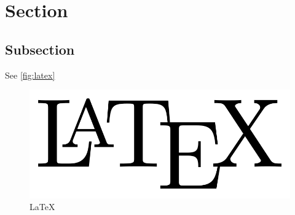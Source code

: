 \section{Section}
\subsection{Subsection}

See \autoref{fig:latex}

\begin{figure}
	\begin{center}
	\includegraphics[scale=0.3]{./img/LaTeX-logo.png} 
	\end{center}
	\caption{\LaTeX}
	\label{fig:latex}
\end{figure}
